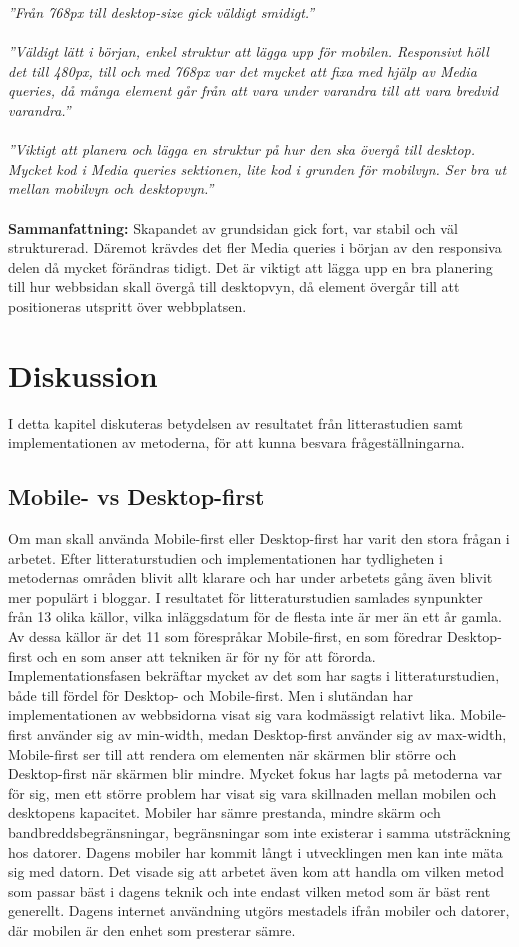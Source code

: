 \documentclass[11pt]{article}
\begin{document}
\textit{”Från 768px till desktop-size gick väldigt smidigt.”}\\\\
\textit{”Väldigt lätt i början, enkel struktur att lägga upp för mobilen. Responsivt höll det till 480px, till och med 768px var det mycket att fixa med hjälp av Media queries, då många element går från att vara under varandra till att vara bredvid varandra.”}\\\\
\textit{”Viktigt att planera och lägga en struktur på hur den ska övergå till desktop. Mycket kod i Media queries sektionen, lite kod i grunden för mobilvyn.  Ser bra ut mellan mobilvyn och desktopvyn.”}\\\\
\textbf{Sammanfattning:} Skapandet av grundsidan gick fort, var stabil och väl strukturerad. Däremot krävdes det fler Media queries i början av den responsiva delen då mycket förändras tidigt. Det är viktigt att lägga upp en bra planering till hur webbsidan skall övergå till desktopvyn, då element övergår till att positioneras utspritt över webbplatsen.



\section{Diskussion}
I detta kapitel diskuteras betydelsen av resultatet från litterastudien samt implementationen av metoderna, för att kunna besvara frågeställningarna.
\subsection{Mobile- vs Desktop-first}
Om man skall använda Mobile-first eller Desktop-first har varit den stora frågan i arbetet. Efter litteraturstudien och implementationen har tydligheten i metodernas områden blivit allt klarare och har under arbetets gång även blivit mer populärt i bloggar. I resultatet för litteraturstudien samlades synpunkter från 13 olika källor, vilka inläggsdatum för de flesta inte är mer än ett år gamla. Av dessa källor är det 11 som förespråkar Mobile-first, en som föredrar Desktop-first och en som anser att tekniken är för ny för att förorda. Implementationsfasen bekräftar mycket av det som har sagts i litteraturstudien, både till fördel för Desktop- och Mobile-first. Men i slutändan har implementationen av webbsidorna visat sig vara kodmässigt relativt lika. Mobile-first använder sig av min-width, medan Desktop-first använder sig av max-width, Mobile-first ser till att rendera om elementen när skärmen blir större och Desktop-first när skärmen blir mindre. Mycket fokus har lagts på metoderna var för sig, men ett större problem har visat sig vara skillnaden mellan mobilen och desktopens kapacitet. Mobiler har sämre prestanda, mindre skärm och bandbreddsbegränsningar, begränsningar som inte existerar i samma utsträckning hos datorer. Dagens mobiler har kommit långt i utvecklingen men kan inte mäta sig med datorn. Det visade sig att arbetet även kom att handla om vilken metod som passar bäst i dagens teknik och inte endast vilken metod som är bäst rent generellt. Dagens internet användning utgörs mestadels ifrån mobiler och datorer, där mobilen är den enhet som presterar sämre. 
\end{document}
